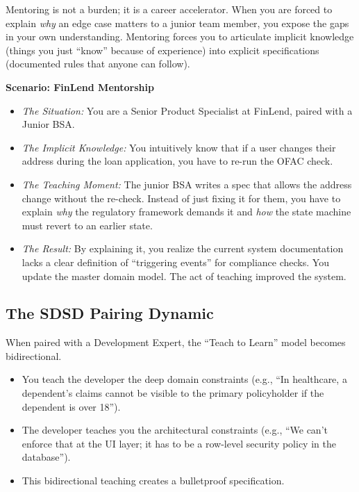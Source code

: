Mentoring is not a burden; it is a career accelerator. When you are
forced to explain \emph{why} an edge case matters to a junior team
member, you expose the gaps in your own understanding. Mentoring forces
you to articulate implicit knowledge (things you just ``know'' because
of experience) into explicit specifications (documented rules that
anyone can follow).

\textbf{Scenario: FinLend Mentorship}

\begin{itemize}
\tightlist
\item
  \emph{The Situation:} You are a Senior Product Specialist at FinLend,
  paired with a Junior BSA.
\item
  \emph{The Implicit Knowledge:} You intuitively know that if a user
  changes their address during the loan application, you have to re-run
  the OFAC check.
\item
  \emph{The Teaching Moment:} The junior BSA writes a spec that allows
  the address change without the re-check. Instead of just fixing it for
  them, you have to explain \emph{why} the regulatory framework demands
  it and \emph{how} the state machine must revert to an earlier state.
\item
  \emph{The Result:} By explaining it, you realize the current system
  documentation lacks a clear definition of ``triggering events'' for
  compliance checks. You update the master domain model. The act of
  teaching improved the system.
\end{itemize}

\subsection{The SDSD Pairing Dynamic}\label{the-sdsd-pairing-dynamic}

When paired with a Development Expert, the ``Teach to Learn'' model
becomes bidirectional.

\begin{itemize}
\tightlist
\item
  You teach the developer the deep domain constraints (e.g., ``In
  healthcare, a dependent's claims cannot be visible to the primary
  policyholder if the dependent is over 18'').
\item
  The developer teaches you the architectural constraints (e.g., ``We
  can't enforce that at the UI layer; it has to be a row-level security
  policy in the database'').
\item
  This bidirectional teaching creates a bulletproof specification.
\end{itemize}

